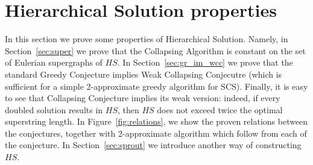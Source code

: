 \section{Hierarchical Solution properties}
In this section we prove some properties of Hierarchical Solution. Namely, in Section~\ref{sec:super} we prove that the Collapsing Algorithm is constant on the set of Eulerian supergraphs of $HS$. In Section~\ref{sec:gr_im_wcc} we prove that the standard Greedy Conjecture implies Weak Collapsing Conjecutre (which is sufficient for a simple 2-approximate greedy algorithm for SCS). Finally, it is easy to see that Collapsing Conjecture implies its weak version: indeed, if every doubled solution results in $HS$, then $HS$ does not exceed twice the optimal superstring length. In Figure~\ref{fig:relations}, we show the proven relations between the conjectures, together with 2-approximate algorithm which follow from each of the conjecture. In Section~\ref{sec:sprout} we introduce another way of constructing $HS$.

